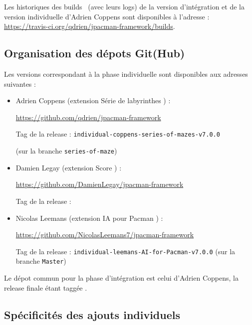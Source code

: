 \documentclass[12pt, openany]{report}
\begin{document}
Les historiques des \og builds \fg \, (avec leurs logs) de la version d'intégration et de la version individuelle d'Adrien Coppens sont disponibles à l'adresse : \url{https://travis-ci.org/qdrien/jpacman-framework/builds}.

\subsection{Organisation des dépots Git(Hub)}
Les versions correspondant à la phase individuelle sont disponibles aux adresses suivantes :
\begin{itemize}
	\item Adrien Coppens (extension \og Série de labyrinthes \fg ) : 
	
	\url{https://github.com/qdrien/jpacman-framework}
	
	Tag de la release : \nolinkurl{individual-coppens-series-of-mazes-v7.0.0}
	
	(sur la branche \nolinkurl{series-of-maze})
	\item Damien Legay (extension \og Score \fg ) : 
	
	\url{https://github.com/DamienLegay/jpacman-framework}
	
	Tag de la release : \nolinkurl{}%
	\item Nicolas Leemans (extension \og IA pour Pacman \fg ) : 
	
	\url{https://github.com/NicolasLeemans7/jpacman-framework}
	
	Tag de la release : \nolinkurl{individual-leemans-AI-for-Pacman-v7.0.0}
	(sur la branche \nolinkurl{Master})
\end{itemize}

Le dépot commun pour la phase d'intégration est celui d'Adrien Coppens, la release finale étant taggée \nolinkurl{}. %



\subsection{Spécificités des ajouts individuels}
\end{document}
